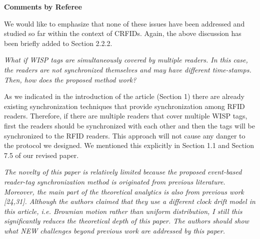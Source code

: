 \documentclass[10pt]{article}
\newcommand{\referee}[1]{
	{\item \color{OliveGreen} \emph{{#1}}}
	\label{R\therefereeCounter:\arabic{enumi}}
}
\newcommand{\response}[1]{{\color{blue} #1}}
\newcounter{refereeCounter}
\newenvironment{responses}{%
\refstepcounter{refereeCounter}%
\textbf{\large Comments by Referee \therefereeCounter}
\begin{enumerate}%
\renewcommand{\labelenumi}{\textbf{[R\therefereeCounter :\,\arabic{enumi}]}} %
}{\end{enumerate}}
\begin{document}
\begin{responses}
{We would like to emphasize that none of these issues have been addressed and studied so far within the context of CRFIDs. Again, the above discussion has been briefly added to Section 2.2.2.}

\referee{What if WISP tags are simultaneously covered by multiple readers. In this case, the readers are not synchronized themselves and may have different time-stamps. Then, how does the proposed method work?}

\response{As we indicated in the introduction of the article (Section 1) there are already existing synchronization techniques that provide synchronization among RFID readers. Therefore, if there are multiple readers that cover multiple WISP tags, first the readers should be synchronized with each other and then the tags will be synchronized to the RFID readers. This approach will not cause any danger to the protocol we designed. We mentioned this explicitly in Section 1.1 and Section 7.5 of our revised paper.}
	
\referee{The novelty of this paper is relatively limited because the proposed event-based reader-tag synchronization method is originated from previous literature. Moreover, the main part of the theoretical analytics is also from previous work [24,31]. Although the authors claimed that they use a different clock drift model in this article, i.e. Brownian motion rather than uniform distribution, I still this significantly reduces the theoretical depth of this paper. The authors should show what NEW challenges beyond previous work are addressed by this paper.}


\end{responses}
\end{document}
